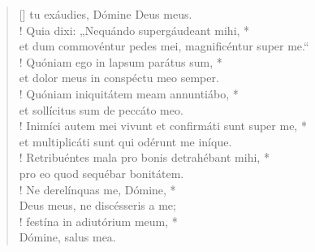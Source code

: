 \begin{verse}[\versewidth]
tu exáudies, Dómine Deus meus.\\!
\vin Quia dixi: „Nequándo supergáudeant mihi, *\\
\vin et dum commovéntur pedes mei, magnificéntur super me.“\\!
Quóniam ego in lapsum parátus sum, *\\
et dolor meus in conspéctu meo semper.\\!
\vin Quóniam iniquitátem meam annuntiábo, *\\
\vin et sollícitus sum de peccáto meo.\\!
Inimíci autem mei vivunt et confirmáti sunt super me, *\\
et multiplicáti sunt qui odérunt me iníque.\\!
\vin Retribuéntes mala pro bonis detrahébant mihi, *\\
\vin pro eo quod sequébar bonitátem.\\!
Ne derelínquas me, Dómine, *\\
Deus meus, ne discésseris a me;\\!
\vin festína in adiutórium meum, *\\
\vin Dómine, salus mea.\\
\end{verse}
\vspace{1cm}


